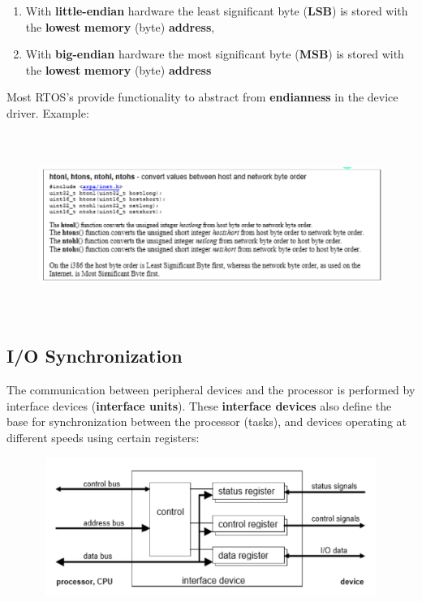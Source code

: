 \begin{enumerate}
\item  With \textbf{little-endian} hardware the least significant byte (\textbf{LSB}) is stored with the \textbf{lowest} \textbf{memory} (byte) \textbf{address}, 

\item  With \textbf{big-endian} hardware the most significant byte (\textbf{MSB}) is stored with the \textbf{lowest} \textbf{memory} (byte) \textbf{address}
\end{enumerate}

Most RTOS's provide functionality to abstract from \textbf{endianness} in the device driver. Example:

 	\begin{figure}[h]
    \centering
    \includegraphics[width=14cm, height=6cm]{Images/image121.png}
    \label{fig:Fig }
    \end{figure}

\subsection{I/O Synchronization}

The communication between peripheral devices and the processor is performed by interface devices\textbf{ }(\textbf{interface units}). These \textbf{interface devices} also define the base for synchronization between the processor (tasks), and devices operating at different speeds using certain registers:

 	\begin{figure}[h]
    \centering
    \includegraphics[width=12cm, height=4.5cm]{Images/image122.png}
    \label{fig:Fig }
    \end{figure}

